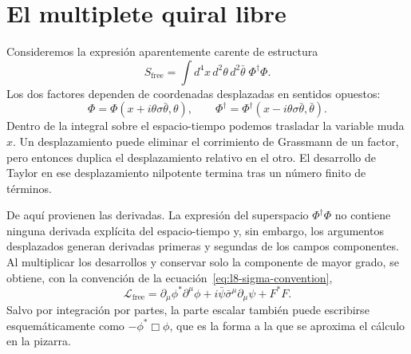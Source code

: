 \section{El multiplete quiral libre}

Consideremos la expresión aparentemente carente de estructura
\begin{equation}
S_{\mathrm{free}}
=\int d^4x\,d^2\theta\,d^2\bar\theta\;
\Phi^\dagger\Phi.
\label{eq:l8-free-superaction}
\end{equation}
Los dos factores dependen de coordenadas desplazadas en sentidos opuestos:
\begin{equation}
\Phi=\Phi(x+i\theta\sigma\bar\theta,\theta),
\qquad
\Phi^\dagger
=\Phi^\dagger(x-i\theta\sigma\bar\theta,\bar\theta).
\end{equation}
Dentro de la integral sobre el espacio-tiempo podemos trasladar la variable muda \(x\). Un desplazamiento puede eliminar el corrimiento de Grassmann de un factor, pero entonces duplica el desplazamiento relativo en el otro. El desarrollo de Taylor en ese desplazamiento nilpotente termina tras un número finito de términos.

De aquí provienen las derivadas. La expresión del superspacio
\(\Phi^\dagger\Phi\) no contiene ninguna derivada explícita del espacio-tiempo y, sin embargo, los argumentos desplazados generan derivadas primeras y segundas de los campos componentes. Al multiplicar los desarrollos y conservar solo la componente de mayor grado, se obtiene, con la convención de la ecuación~\eqref{eq:l8-sigma-convention},
\begin{equation}
\mathcal L_{\mathrm{free}}
=\partial_\mu\phi^\ast\partial^\mu\phi
+i\bar\psi\bar\sigma^\mu\partial_\mu\psi
+F^\ast F.
\label{eq:l8-free-component-lagrangian}
\end{equation}
Salvo por integración por partes, la parte escalar también puede escribirse esquemáticamente como \(-\phi^\ast\Box\phi\), que es la forma a la que se aproxima el cálculo en la pizarra.

\begin{classroomqa}
\end{classroomqa}

